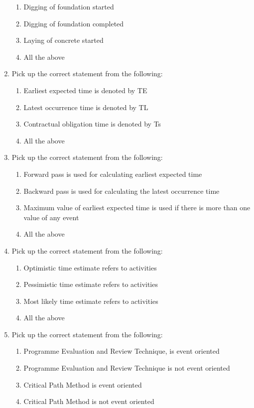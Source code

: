 \documentclass[11pt,a4paper]{article}
\begin{document}
\begin{enumerate}
\begin{enumerate}[label=\Alph*.]
\item{Digging of foundation started}
\item{Digging of foundation completed}
\item{Laying of concrete started}
\item{All the above}
\end{enumerate}
\item{Pick up the correct statement from the following:}
\begin{enumerate}[label=\Alph*.]
\item{Earliest expected time is denoted by TE}
\item{Latest occurrence time is denoted by TL}
\item{Contractual obligation time is denoted by Ts}
\item{All the above}
\end{enumerate}
\item{Pick up the correct statement from the following:}
\begin{enumerate}[label=\Alph*.]
\item{Forward pass is used for calculating earliest expected time}
\item{Backward pass is used for calculating the latest occurrence time}
\item{Maximum value of earliest expected time is used if there is more than one value of any event}
\item{All the above}
\end{enumerate}
\item{Pick up the correct statement from the following:}
\begin{enumerate}[label=\Alph*.]
\item{Optimistic time estimate refers to activities}
\item{Pessimistic time estimate refers to activities}
\item{Most likely time estimate refers to activities}
\item{All the above}
\end{enumerate}
\item{Pick up the correct statement from the following:}
\begin{enumerate}[label=\Alph*.]
\item{Programme Evaluation and Review Technique, is event oriented}
\item{Programme Evaluation and Review Technique is not event oriented}
\item{Critical Path Method is event oriented}
\item{Critical Path Method is not event oriented}

\end{enumerate}
\end{enumerate}
\end{document}
